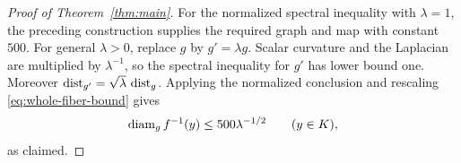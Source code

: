 \begin{proof}[Proof of Theorem~\ref{thm:main}]
For the normalized spectral inequality with $\lambda=1$,
the preceding construction supplies the required graph
and map with constant $500$.  For general $\lambda>0$,
replace $g$ by $g'=\lambda g$.  Scalar curvature and
the Laplacian are multiplied by $\lambda^{-1}$, so the
spectral inequality for $g'$ has lower bound one.
Moreover $\operatorname{dist}_{g'}=\sqrt\lambda\,\operatorname{dist}_g$.
Applying the normalized conclusion and rescaling
\eqref{eq:whole-fiber-bound} gives
\[
 \operatorname{diam}_g f^{-1}(y)\le500\lambda^{-1/2}
 \qquad(y\in K),
\]
as claimed.
\end{proof}
